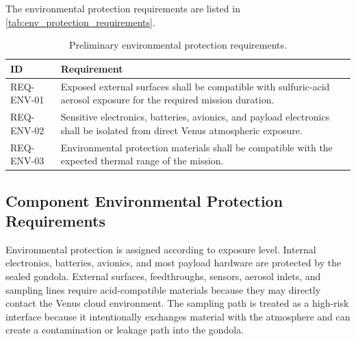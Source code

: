 The environmental protection requirements are listed in \autoref{tab:env_protection_requirements}.

\begin{table}[H]
\centering
\small
\caption{Preliminary environmental protection requirements.}
\label{tab:env_protection_requirements}
\renewcommand{\arraystretch}{1}
\begin{tabular}{|p{2.8cm}|p{10.5cm}|}
\hline
\textbf{ID} & \textbf{Requirement} \\
\hline
REQ-ENV-01 & Exposed external surfaces shall be compatible with sulfuric-acid aerosol exposure for the required mission duration. \\
\hline
REQ-ENV-02 & Sensitive electronics, batteries, avionics, and payload electronics shall be isolated from direct Venus atmospheric exposure. \\
\hline
REQ-ENV-03 & Environmental protection materials shall be compatible with the expected thermal range of the mission. \\
\hline
\end{tabular}
\end{table}

\subsection{Component Environmental Protection Requirements}
\label{sec:component_environmental_protection_requirements}

Environmental protection is assigned according to exposure level. Internal electronics, batteries, avionics, and most payload hardware are protected by the sealed gondola. External surfaces, feedthroughs, sensors, aerosol inlets, and sampling lines require acid-compatible materials because they may directly contact the Venus cloud environment. The sampling path is treated as a high-risk interface because it intentionally exchanges material with the atmosphere and can create a contamination or leakage path into the gondola.

